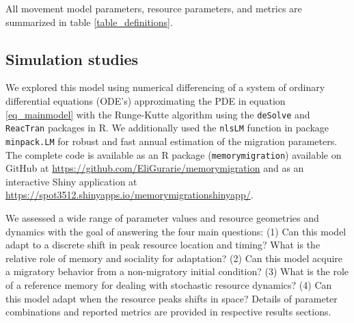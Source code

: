 \documentclass[utf8]{frontiersSCNS} %
\begin{document}
	All movement model parameters, resource parameters, and metrics are summarized in table \ref{table_definitions}. 
	
\subsection{Simulation studies}
	
	We explored this model using numerical differencing of a system of ordinary differential equations (ODE's) approximating the PDE in equation \ref{eq_mainmodel} with the Runge-Kutte algorithm using the \texttt{deSolve} \citep{Soetaert2010} and \texttt{ReacTran} \citep{Soetaert2012} packages in R. We additionally used the \texttt{nlsLM} function in package \texttt{minpack.LM} \citep{minpack.lm} for robust and fast annual estimation of the migration parameters. The complete code is available as an R package (\texttt{memorymigration}) available on GitHub at \url{https://github.com/EliGurarie/memorymigration} and as an interactive Shiny application at \url{https://spot3512.shinyapps.io/memorymigrationshinyapp/}.
	
	We assessed a wide range of parameter values and resource geometries and dynamics with the goal of answering the four main questions: (1) Can this model adapt to a discrete shift in peak resource location and timing?  What is the relative role of memory and sociality for adaptation? (2) Can this model acquire a migratory behavior from a non-migratory initial condition? (3) What is the role of a reference memory for dealing with stochastic resource dynamics? (4) Can this model adapt when the resource peaks shifts in space?  Details of parameter combinations and reported metrics are provided in respective results sections. 
	
\end{document}

